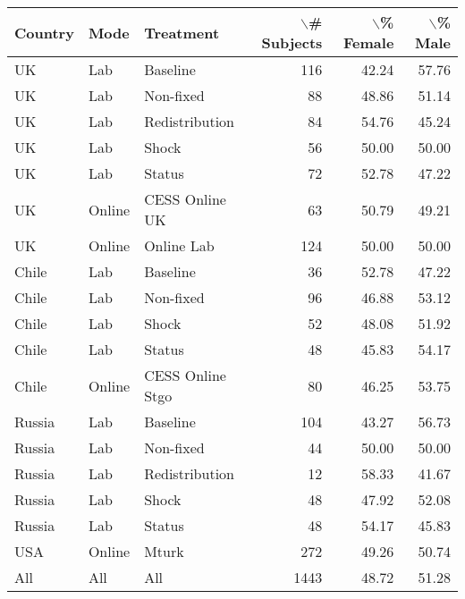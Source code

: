\begin{tabular}{lllrrr}
  \hline
Country & Mode & Treatment & $\backslash$\# Subjects & $\backslash$\% Female & $\backslash$\% Male \\ 
  \hline
UK & Lab & Baseline & 116 & 42.24 & 57.76 \\ 
  UK & Lab & Non-fixed &  88 & 48.86 & 51.14 \\ 
  UK & Lab & Redistribution &  84 & 54.76 & 45.24 \\ 
  UK & Lab & Shock &  56 & 50.00 & 50.00 \\ 
  UK & Lab & Status &  72 & 52.78 & 47.22 \\ 
  UK & Online & CESS Online UK &  63 & 50.79 & 49.21 \\ 
  UK & Online & Online Lab & 124 & 50.00 & 50.00 \\ 
  Chile & Lab & Baseline &  36 & 52.78 & 47.22 \\ 
  Chile & Lab & Non-fixed &  96 & 46.88 & 53.12 \\ 
  Chile & Lab & Shock &  52 & 48.08 & 51.92 \\ 
  Chile & Lab & Status &  48 & 45.83 & 54.17 \\ 
  Chile & Online & CESS Online Stgo &  80 & 46.25 & 53.75 \\ 
  Russia & Lab & Baseline & 104 & 43.27 & 56.73 \\ 
  Russia & Lab & Non-fixed &  44 & 50.00 & 50.00 \\ 
  Russia & Lab & Redistribution &  12 & 58.33 & 41.67 \\ 
  Russia & Lab & Shock &  48 & 47.92 & 52.08 \\ 
  Russia & Lab & Status &  48 & 54.17 & 45.83 \\ 
  USA & Online & Mturk & 272 & 49.26 & 50.74 \\ 
  All & All & All & 1443 & 48.72 & 51.28 \\ 
   \hline
\end{tabular}
